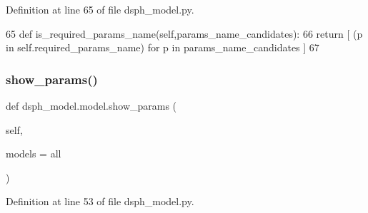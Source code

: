 Definition at line 65 of file dsph\+\_\+model.\+py.


\begin{DoxyCode}
65     \textcolor{keyword}{def }is\_required\_params\_name(self,params\_name\_candidates):
66         \textcolor{keywordflow}{return} [ (p \textcolor{keywordflow}{in} self.required\_params\_name) \textcolor{keywordflow}{for} p \textcolor{keywordflow}{in} params\_name\_candidates ]
67 
\end{DoxyCode}
\mbox{\label{classdsph__model_1_1model_a44b8bf302a0786eb9a492a904213f977}} 
\subsubsection{\texorpdfstring{show\+\_\+params()}{show\_params()}}
{\footnotesize\ttfamily def dsph\+\_\+model.\+model.\+show\+\_\+params (\begin{DoxyParamCaption}\item[{}]{self,  }\item[{}]{models = {\ttfamily \textquotesingle{}all\textquotesingle{}} }\end{DoxyParamCaption})}



Definition at line 53 of file dsph\+\_\+model.\+py.


